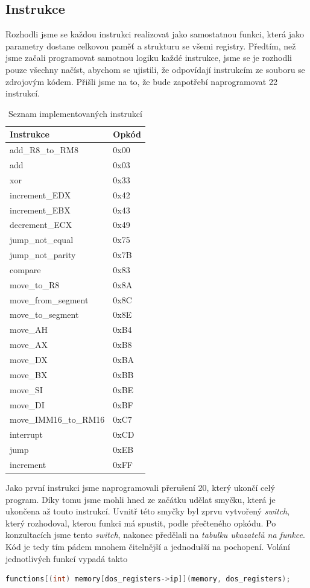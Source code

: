 \documentclass[a4paper, 12pt]{article}
\begin{document}
\subsection{Instrukce}
Rozhodli jsme se každou instrukci realizovat jako samostatnou funkci, která jako parametry dostane celkovou paměť a strukturu se všemi registry. Předtím, než jsme začali programovat samotnou logiku každé instrukce, jsme se je rozhodli pouze všechny načíst, abychom se ujistili, že odpovídají instrukcím ze souboru se zdrojovým kódem. Přišli jsme na to, že bude zapotřebí naprogramovat 22 instrukcí.
\begin{table}[h!]
\centering
\caption{Seznam implementovaných instrukcí}
\label{tab1}
\begin{tabular}{|l|l|}
\hline
Instrukce & Opkód \\\hline
add\_R8\_to\_RM8 & 0x00 \\
add & 0x03 \\
xor & 0x33 \\
increment\_EDX & 0x42 \\
increment\_EBX & 0x43 \\
decrement\_ECX & 0x49 \\
jump\_not\_equal & 0x75 \\
jump\_not\_parity & 0x7B \\
compare & 0x83 \\
move\_to\_R8 & 0x8A \\
move\_from\_segment & 0x8C \\
move\_to\_segment & 0x8E \\
move\_AH & 0xB4 \\
move\_AX & 0xB8 \\
move\_DX & 0xBA \\
move\_BX & 0xBB \\
move\_SI & 0xBE \\
move\_DI & 0xBF \\
move\_IMM16\_to\_RM16 & 0xC7 \\
interrupt & 0xCD \\
jump & 0xEB \\
increment & 0xFF \\\hline
\end{tabular}
\end{table}
Jako první instrukci jsme naprogramovali přerušení 20, který ukončí celý program. Díky tomu jsme mohli hned ze začátku udělat smyčku, která je ukončena až touto instrukcí. Uvnitř této smyčky byl zprvu vytvořený \textit{switch}, který rozhodoval, kterou funkci má spustit, podle přečteného opkódu. Po konzultacích jsme tento \textit{switch}, nakonec předělali na \textit{tabulku ukazatelů na funkce}. Kód je tedy tím pádem mnohem čitelnější a jednodušší na pochopení. Volání jednotlivých funkcí vypadá takto
\begin{lstlisting}[basicstyle=\small,language=C]
functions[(int) memory[dos_registers->ip]](memory, dos_registers);
\end{lstlisting}
\end{document}
